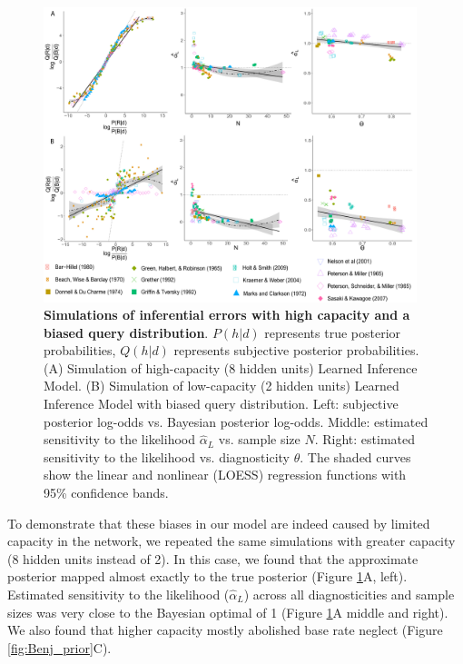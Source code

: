 \begin{figure}
\centering
      \includegraphics[width=0.97\textwidth]{figures/Benjamin_control_hor.pdf}
  \caption{\textbf{Simulations of inferential errors with high capacity and a biased query distribution}. $P(h | d)$ represents true posterior probabilities, $Q(h | d)$ represents subjective posterior probabilities. (A) Simulation of high-capacity (8 hidden units) Learned Inference Model. (B) Simulation of low-capacity (2 hidden units) Learned Inference Model with biased query distribution. Left: subjective posterior log-odds vs. Bayesian posterior log-odds. Middle: estimated sensitivity to the likelihood $\hat{\alpha}_L$ vs. sample size $N$. Right: estimated sensitivity to the likelihood vs. diagnosticity $\theta$. The shaded curves show the linear and nonlinear (LOESS) regression functions with 95\% confidence bands.} 
  \label{fig:Benj_control}
\end{figure}

To demonstrate that these biases in our model are indeed caused by limited capacity in the network, we repeated the same simulations with greater capacity (8 hidden units instead of 2). In this case, we found that the approximate posterior mapped almost exactly to the true posterior (Figure \ref{fig:Benj_control}A, left). Estimated sensitivity to the likelihood ($\hat{\alpha}_L$) across all diagnosticities and sample sizes was very close to the Bayesian optimal of 1 (Figure \ref{fig:Benj_control}A middle and right). We also found that higher capacity mostly abolished base rate neglect (Figure \ref{fig:Benj_prior}C).

